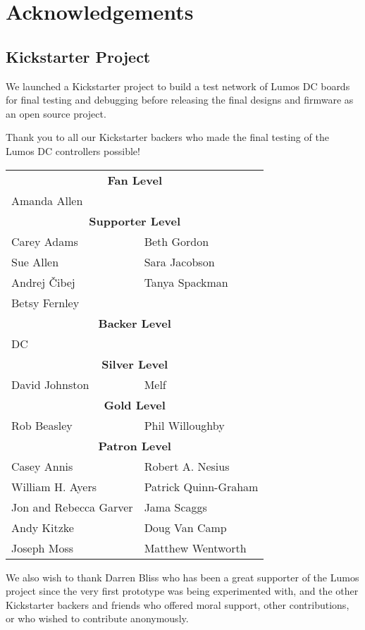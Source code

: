 \chapter{Acknowledgements}

\section*{Kickstarter Project}
We launched a Kickstarter project to build a test network of Lumos DC boards for final testing
and debugging before releasing the final designs and firmware as an open source 
project.

Thank you to all our Kickstarter backers who made the final testing of the Lumos DC controllers
possible!

\begin{center}
\begin{tabular}{ll}
\multicolumn{2}{c}{\bfseries Fan Level}\\
Amanda Allen\\
\multicolumn{2}{c}{{\huge\strut}\bfseries Supporter Level}\\
Carey Adams &
Beth Gordon  \\
Sue Allen &
Sara Jacobson \\
Andrej \v Cibej &
Tanya Spackman \\
Betsy Fernley \\
\multicolumn{2}{c}{{\huge\strut}\bfseries Backer Level}\\
DC \\
\multicolumn{2}{c}{{\huge\strut}\bfseries Silver Level}\\
David Johnston & Melf \\
\multicolumn{2}{c}{{\huge\strut}\bfseries Gold Level}\\
Rob Beasley & Phil Willoughby \\
\multicolumn{2}{c}{{\huge\strut}\bfseries Patron Level}\\
Casey Annis&
Robert A. Nesius\\
William H. Ayers&
Patrick Quinn-Graham\\
Jon and Rebecca Garver&
Jama Scaggs\\
Andy Kitzke&
Doug Van Camp\\
Joseph Moss&
Matthew Wentworth
\end{tabular}
\end{center}
We also wish to thank Darren Bliss who has been a great supporter of the Lumos project
since the very first prototype was being experimented with, and the other Kickstarter 
backers and friends who offered moral support, 
other contributions, or who wished to contribute anonymously.
